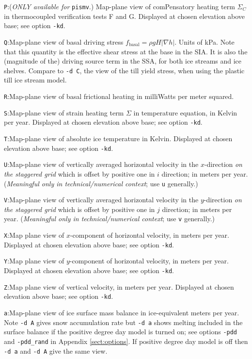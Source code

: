 \documentclass[11pt,final]{amsart}
\renewcommand{\t}[1]{\texttt{#1}}
\newcommand{\grad}{\nabla}
\begin{document}
\verb|P|:\quad \notMat (\emph{ONLY available for }\t{pismv}.)  Map-plane view of comPensatory heating term $\Sigma_C$ in thermocoupled verification tests F and G.  Displayed at chosen elevation above base; see option \verb|-kd|.

\verb|Q|:\quad Map-plane view of basal driving stress $f_{\text{basal}} = \rho g H |\grad h|$.  Units of kPa.  Note that this quantity is the effective shear stress at the base in the SIA.  It is also the (magnitude of the) driving source term in the SSA, for both ice streams and ice shelves.  Compare to \verb|-d C|, the view of the till yield stress, when using the plastic till ice stream model.

\verb|R|:\quad Map-plane view of basal frictional heating in milliWatts per meter squared.

\verb|S|:\quad Map-plane view of strain heating term $\Sigma$ in temperature equation, in Kelvin per year.  Displayed at chosen elevation above base; see option \verb|-kd|.

\verb|T|:\quad Map-plane view of absolute ice temperature in Kelvin.  Displayed at chosen elevation above base; see option \verb|-kd|.

\verb|U|:\quad Map-plane view of vertically averaged horizontal velocity in the $x$-direction \emph{on the staggered grid} which is offset by positive one in $i$ direction;  in meters per year.  (\emph{Meaningful only in technical/numerical context}; use \verb|u| generally.)

\verb|V|:\quad Map-plane view of vertically averaged horizontal velocity in the $y$-direction \emph{on the staggered grid} which is offset by positive one in $j$ direction;  in meters per year.  (\emph{Meaningful only in technical/numerical context}; use \verb|v| generally.)

\verb|X|:\quad Map plane view of $x$-component of horizontal velocity, in meters per year.  Displayed at chosen elevation above base; see option \verb|-kd|.

\verb|Y|:\quad Map plane view of $y$-component of horizontal velocity, in meters per year.  Displayed at chosen elevation above base; see option \verb|-kd|.

\verb|Z|:\quad Map plane view of vertical velocity, in meters per year.  Displayed at chosen elevation above base; see option \verb|-kd|.

\verb|a|:\quad Map-plane view of ice surface mass balance in ice-equivalent meters per year.  Note \verb|-d A| gives snow accumulation rate but \verb|-d a| shows melting included in the surface balance if the positive degree day model is turned on; see options \verb|-pdd| and \verb|-pdd_rand| in Appendix \ref{sect:options}.  If positive degree day model is off then \verb|-d a| and \verb|-d A| give the same view.
\end{document}
